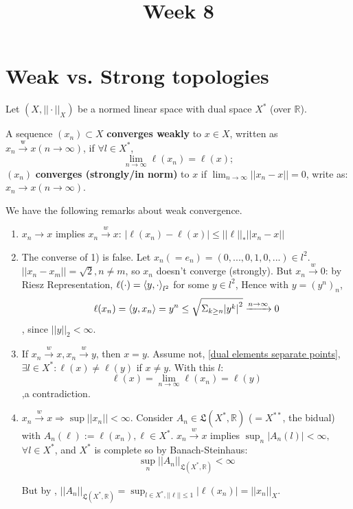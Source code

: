 \documentclass{article}
\title{Week 8}
\begin{document}
  
\author{\aut}
\maketitle
\section{Weak vs. Strong topologies}
Let $(X, || \cdot ||_X)$ be a normed linear space with dual space $X^*$ (over $\mathbb{R}$).

\begin{definition}\nl
A sequence $(x_n) \subset X$ \textbf{converges weakly} to $x\in X$, written as $x_n \xrightarrow{\text{w}} x (n \rightarrow \infty)$, if $\forall l \in X^*$, 
    $$\lim_{n\rightarrow \infty} \ell(x_n) = \ell(x);$$
$(x_n)$ \textbf{converges (strongly/in norm)} to $x$ if $\lim_{n\rightarrow \infty} ||x_n - x|| = 0$, write as: $x_n \rightarrow x (n\rightarrow \infty).$
\end{definition}

\begin{remark}
\label{properties of weak convergence}
We have the following remarks about weak convergence.  

\begin{enumerate}[1)]
    \item $x_n\rightarrow x$ implies  $x_n \xrightarrow{w} x$: $|\ell(x_n) - \ell(x)| \leq ||\ell||_* ||x_n - x||$
    
    \item The converse of 1) is false. Let $x_n (= e_n) = (0,...,0,1,0,...) \in l^2$. $||x_n-x_m|| = \sqrt{2}, n\neq m$, so $x_n$ doesn't converge (strongly). But $x_n \xrightarrow{w} 0$: by Riesz Representation, $\ell(\cdot) = \left<{y},{\cdot}\right>_{l^2}$ for some $y \in l^2$, Hence with $y=(y^n)_n$, $$\ell(x_n) = \left<{y},{x_n}\right> = y^n \leq \sqrt{\Sigma_{k\geq n} {|y^k|}^2} \xrightarrow{n\rightarrow \infty} 0$$, since $||y||_2 < \infty$.
    
    \item If $x_n \xrightarrow{w} x, x_n \xrightarrow{w} y$, then $x=y$. Assume not, \cref{dual elements separate points}, $\exists l \in X^*: \ell(x) \neq \ell(y)$ if $x\neq y$. With this $l$: $$\ell(x) = \lim_{n \to \infty} \ell(x_n) = \ell(y) $$ 
    ,a contradiction.
    
    \item $x_n \xrightarrow{w} x \Rightarrow \sup||x_n|| < \infty$. Consider $A_n \in \mathfrak{L}(X^*, \mathbb{R})$ ($=X^{**}$, the bidual) with $A_n(\ell) := \ell(x_n), \ell \in X^*$. $x_n \xrightarrow{w} x$ implies $\sup_n |A_n(l)| < \infty,$ $\forall l\in X^*$, and $X^*$ is complete so by Banach-Steinhaus: $$\sup_n ||A_n||_{\mathfrak{L}(X^*, \mathbb{R})} < \infty$$ 
    
    But by ,  $||A_n||_{\mathfrak{L}(X^*,\mathbb{R})} = \sup_{l\in X^*, ||\ell||\leq 1} |\ell(x_n)| = ||x_n||_X$.
\end{enumerate}
\end{remark}
\end{document}
